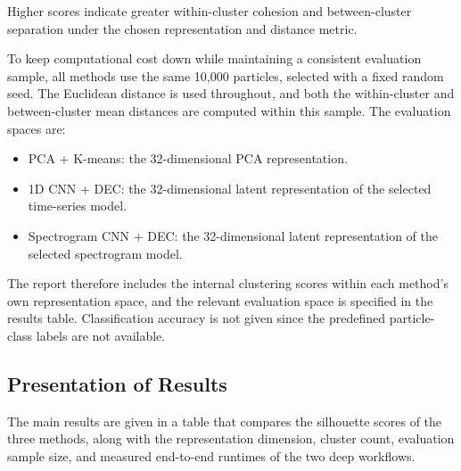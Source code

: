 Higher scores indicate greater within-cluster cohesion and between-cluster separation under the chosen representation and distance metric.

To keep computational cost down while maintaining a consistent evaluation sample, all methods use the same 10,000 particles, selected with a fixed random seed. The Euclidean distance is used throughout, and both the within-cluster and between-cluster mean distances are computed within this sample. The evaluation spaces are:

\begin{itemize}
\item PCA + K-means: the 32-dimensional PCA representation.

\item 1D CNN + DEC: the 32-dimensional latent representation of the selected time-series model.

\item Spectrogram CNN + DEC: the 32-dimensional latent representation of the selected spectrogram model.
\end{itemize}

The report therefore includes the internal clustering scores within each method's own representation space, and the relevant evaluation space is specified in the results table. Classification accuracy is not given since the predefined particle-class labels are not available.

\subsection{Presentation of Results}

The main results are given in a table that compares the silhouette scores of the three methods, along with the representation dimension, cluster count, evaluation sample size, and measured end-to-end runtimes of the two deep workflows.
